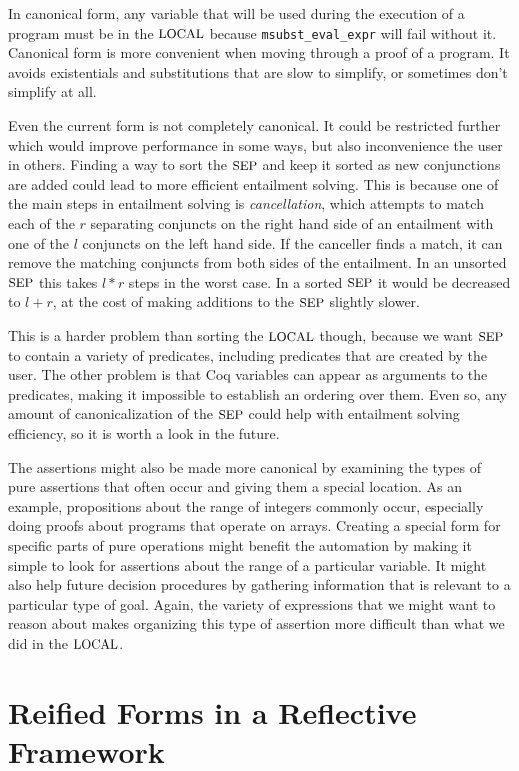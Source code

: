 \documentclass{puthesis}
\begin{document}
In
canonical form, any variable that will be used during the execution of
a program must be in the $\mbox{\small LOCAL}$ because \lstinline|msubst_eval_expr|
will fail without it. Canonical form is more convenient when moving
through a proof of a program. It avoids existentials and substitutions
that are slow to simplify, or sometimes don't simplify at all.

Even the current form is not completely canonical. It could be
restricted further which would improve performance in some ways, but
also inconvenience the user in others. Finding a way to sort the
$\mbox{\small SEP}$ and keep it sorted as new conjunctions are added could lead to
more efficient entailment solving. This is because one of
the main steps in entailment solving is \emph{cancellation}, which
attempts to match
each of the $r$ separating conjuncts on the right hand side of an
entailment with one of the $l$ conjuncts on the left hand side. If the
canceller finds a match, it can remove the matching conjuncts from
both sides of the entailment. In an unsorted $\mbox{\small SEP}$ this takes $l * r$
steps in the worst case. In a sorted $\mbox{\small SEP}$ it would be decreased to
$l + r$, at the cost of making additions to the $\mbox{\small SEP}$ slightly
slower. 

This is a harder problem than sorting the $\mbox{\small LOCAL}$ though, because we
want $\mbox{\small SEP}$ to contain a variety of predicates, including predicates
that are created by the user. The other problem is that Coq variables
can appear as arguments to the predicates, making it impossible to
establish an ordering over them. Even so, any amount of
canonicalization of the $\mbox{\small SEP}$ could help with entailment solving
efficiency, so it is worth a look in the future. 

The assertions might also be made more canonical by examining the
types of pure assertions that often occur and giving them a special
location. As an example, propositions about the range of integers
commonly occur, especially doing proofs about programs that operate on
arrays. Creating a special form for specific parts of pure operations
might benefit the automation by making it simple to look for
assertions about the range of a particular variable. It might also
help future decision procedures by gathering information that is
relevant to a particular type of goal. Again, the variety of
expressions that we might want to reason about makes organizing this
type of assertion more difficult than what we did in the $\mbox{\small LOCAL}$. 


\chapter{Reified Forms in a Reflective Framework}
\label{ch:reflection}
\end{document}
